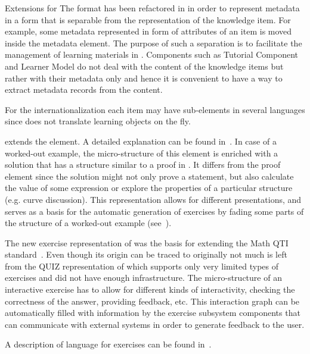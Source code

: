 \begin{omgroup}[id=activemath,short=ActiveMath,
  creators={melis,goguadse,alberto,frischauf,homik,libbrecht,cullrich}]
\begin{omgroup}{{\omdoc} Extensions for {\activemath}}
The {\omdoc} format has been refactored in {\activemath} in order to represent metadata in
a form that is separable from the representation of the knowledge item. For example, some
metadata represented in form of attributes of an item is moved inside the metadata
element. The purpose of such a separation is to facilitate the management of learning
materials in {\activemath}. Components such as Tutorial Component and Learner Model do not
deal with the content of the knowledge items but rather with their metadata only and hence
it is convenient to have a way to extract metadata records from the content.
 
For the internationalization each {\omdoc} item may have sub-elements in several languages
since {\activemath} does not translate learning objects on the fly.

{\activemath} extends the {\omdoc} {} element. A detailed explanation can
be found in~\cite{Melisetal-FadedEx-ITS04-2004}.  In case of a worked-out example, the
micro-structure of this element is enriched with a solution that has a structure similar
to a proof in {\omdoc}.  It differs from the proof element since the solution might not
only prove a statement, but also calculate the value of some expression or explore the
properties of a particular structure (e.g. curve discussion).  This representation allows
for different presentations, and serves as a basis for the automatic generation of
exercises by fading some parts of the structure of a worked-out example
(see~\cite{Melisetal-FadedEx-ITS04-2004}).

The new exercise representation of {\activemath} was the basis for extending the Math QTI
standard~\cite{ENCS04}. Even though its origin can be traced to {\omdoc} originally not
much is left from the QUIZ representation of {\omdoc} which supports only very limited
types of exercises and did not have enough infrastructure.  The micro-structure of an
interactive exercise has to allow for different kinds of interactivity, checking the
correctness of the answer, providing feedback, etc.
This interaction graph can be automatically filled with information  
by the exercise subsystem components that can communicate with external systems in order 
to generate feedback to the user.

A description of {\activemath} language for exercises can be found in~\cite{icce05}.
\end{omgroup}


\end{omgroup}
